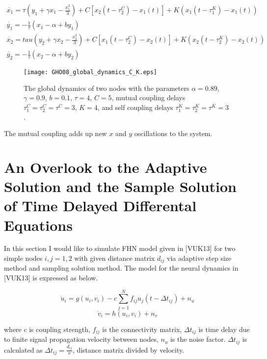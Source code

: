 \begin{subequations}
 \begin{align}\dot{x_1} = \tau (y_1 + \gamma x_1 - \frac{x_1^3}{3}) + C [x_2(t-\tau_2^C)-x_1(t)] + K(x_1(t-\tau_1^K) - x_1(t)) \label{eqn: frobenius 19}\\  \dot{y_1} = -\frac{1}{\tau} (x_1 - \alpha + b y_1) \label{eqn: frobenius 20} \\ \dot{x_2}=tau (y_2 + \gamma x_2 - \frac{x_2^3}{3}) + C [x_1(t-\tau_2^C)-x_2(t)]+ K(x_2(t-\tau_2^K) - x_2(t)) \label{eqn: frobenius 21} \\  \dot{y_2} = -\frac{1}{\tau} (x_2 - \alpha + by_2) \label{eqn: frobenius 22}\end{align} 
\end{subequations}

\newpage

\begin{figure}[h!]
	\centering
	\texttt{[image: GHO08\_global\_dynamics\_C\_K.eps]}
		\caption{The global dynamics of two nodes with the parameters $\alpha = 0.89$, $\gamma=0.9$, $b=0.1$, $\tau = 4$, $C=5$, mutual coupling delays $\tau_1^C=\tau_2^C=\tau^C=3$, $K=4$, and self coupling delays $\tau_1^K=\tau_2^K=\tau^K=3$ .}
\end{figure}

The mutual coupling adds up new $x$ and $y$ oscillations to the system.

\section{An Overlook to the Adaptive Solution and the Sample Solution of Time Delayed Differental Equations}

In this section I would like to simulate FHN model given in [VUK13] for two simple nodes $i,j={1,2}$ with given distance matrix $d_{ij}$ via adaptive step size method and sampling solution method. The model for the neural dynamics in [VUK13] is expressed as below.

\begin{equation}
 \dot{u}_i=g(u_i,v_i)-c \sum_{j=1}^N  f_{ij} u_j(t-\Delta t_{ij})+n_u
\end{equation}
\begin{equation}
 \dot{v}_i=h(u_i,v_i)+n_v
\end{equation}

where $c$ is coupling strength, $f_{ij}$ is the connectivity matrix, $\Delta t_{ij}$ is time delay due to finite signal propagation velocity between nodes, $n_u$ is the noise factor. $\Delta t_{ij}$ is calculated as $\Delta t_{ij}=\frac{d_{ij}}{\nu}$, distance matrix divided by velocity. 


